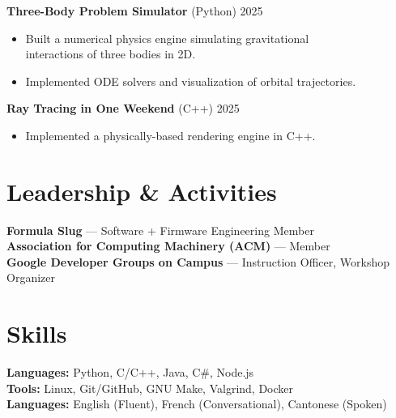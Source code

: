 \documentclass[letterpaper,10pt]{article}
\begin{document}
\textbf{Three-Body Problem Simulator} (Python) \hfill 2025
\begin{itemize}
    \item Built a numerical physics engine simulating gravitational \\
        interactions of three bodies in 2D.
    \item Implemented ODE solvers and visualization of orbital trajectories.
\end{itemize}

\textbf{Ray Tracing in One Weekend} (C++) \hfill 2025
\begin{itemize}
    \item Implemented a physically-based rendering engine in C++.
\end{itemize}

\section*{Leadership \& Activities}
\textbf{Formula Slug} --- Software + Firmware Engineering Member \\
\textbf{Association for Computing Machinery (ACM)} --- Member \\
\textbf{Google Developer Groups on Campus} --- Instruction Officer, Workshop
Organizer

\section*{Skills}
\textbf{Languages:} Python, C/C++, Java, C\#, Node.js \\
\textbf{Tools:} Linux, Git/GitHub, GNU Make, Valgrind, Docker \\
\textbf{Languages:} English (Fluent), French (Conversational), Cantonese
(Spoken)
\end{document}
